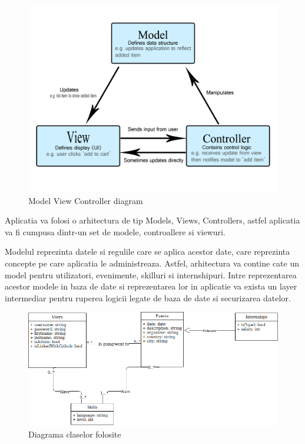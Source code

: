 \documentclass{article}
\begin{document}
\begin{figure}[H]
	\includegraphics[width=1\textwidth]{mvc.png}
	\caption{Model View Controller diagram}
\end{figure}
\bigskip

Aplicatia va folosi o arhitectura de tip Models, Views, Controllers, astfel aplicatia va fi cumpusa dintr-un set de modele, controallere si viewuri.

Modelul reprezinta datele si regulile care se aplica acestor date, care reprezinta concepte pe care aplicatia le administreaza. Astfel, arhitectura va contine cate un model pentru utilizatori, evenimente, skilluri si internshipuri. Intre reprezentarea acestor modele in baza de date si reprezentarea lor in aplicatie va exista un layer intermediar pentru ruperea logicii legate de baza de date si securizarea datelor. 

\begin{figure}[H]
	\includegraphics[width=1\textwidth]{Class-Diagram.png}
	\caption{Diagrama claselor folosite}
\end{figure}
\bigskip
\end{document}
